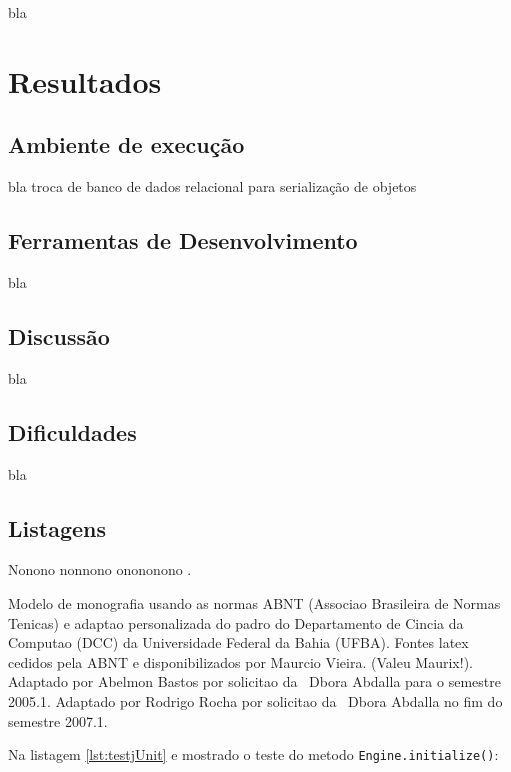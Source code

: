 bla


\chapter{Resultados}
\label{cap:resultados}


\section{Ambiente de execução} \label{sec:ambiente}

bla
troca de banco de dados relacional para serialização de objetos

\section{Ferramentas de Desenvolvimento} \label{sec:ferramentas}

bla

\section{Discussão} \label{sec:discussao}

bla

\section{Dificuldades} \label{sec:dificuldades}

bla



\section{Listagens} \label{sec:listagens}

Nonono nonnono onononono \cite{fowler2000}.

Modelo de monografia usando as normas ABNT (Associao Brasileira de Normas
Tenicas) 
e adaptao personalizada 
do padro do Departamento de Cincia da Computao (DCC) da Universidade
Federal da Bahia (UFBA).
Fontes latex cedidos pela ABNT e disponibilizados por 
Maurcio Vieira. (Valeu Maurix!). Adaptado por Abelmon Bastos por solicitao
da \profa\ Dbora Abdalla para o semestre 2005.1.
Adaptado por Rodrigo Rocha por solicitao da \profa\ Dbora Abdalla no fim
do semestre 2007.1.

Na listagem \ref{lst:testjUnit} 
e mostrado o teste do metodo \texttt{Engine.initialize()}:

